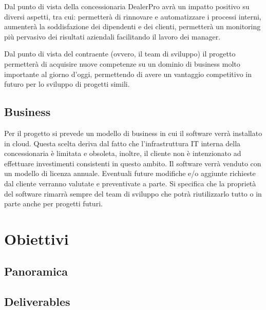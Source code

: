 \documentclass{article}
\begin{document}
  Dal punto di vista della concessionaria DealerPro avrà un impatto positivo su 
    diversi aspetti, tra cui: permetterà di rinnovare e automatizzare i processi
    interni, aumenterà la soddisfazione dei dipendenti e dei clienti, 
    permetterà un monitoring più pervasivo dei risultati aziendali facilitando il 
    lavoro dei manager.

  Dal punto di vista del contraente (ovvero, il team di sviluppo) il progetto 
    permetterà di acquisire nuove competenze su un dominio di business molto importante
    al giorno d'oggi, permettendo di avere un vantaggio competitivo in futuro per lo 
    sviluppo di progetti simili.

  \subsection{Business}
  
  Per il progetto si prevede un modello di business in cui il software verrà installato in cloud. 
    Questa scelta deriva dal fatto che l'infrastruttura IT interna della concessionaria è limitata e obsoleta,
    inoltre, il cliente non è intenzionato ad effettuare investimenti consistenti in questo ambito.
    Il software verrà venduto con un modello di licenza annuale.
    Eventuali future modifiche e/o aggiunte richieste dal cliente verranno valutate e preventivate a parte.
    Si specifica che la proprietà del software rimarrà sempre del team di sviluppo che potrà riutilizzarlo tutto 
    o in parte anche per progetti futuri.



  \newpage
  \section{Obiettivi}

  \subsection{Panoramica}
  \subsection{Deliverables}
\end{document}
